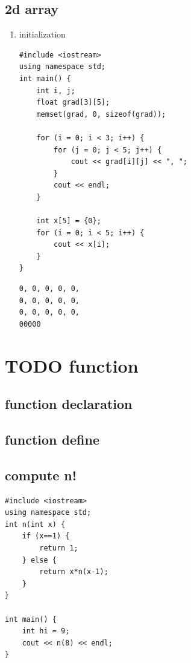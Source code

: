\documentclass[a4paper,12pt]{article}
\begin{document}
\subsection{2d array}
\label{sec:orgfdc5fa9}
\begin{enumerate}
\item initialization
\label{sec:org0519fc6}
\lstset{breaklines=true,language=cpp,label= ,caption= ,captionpos=b,firstnumber=1,numbers=left}
\begin{lstlisting}
#include <iostream>
using namespace std;
int main() {
    int i, j;
    float grad[3][5];
    memset(grad, 0, sizeof(grad));

    for (i = 0; i < 3; i++) {
        for (j = 0; j < 5; j++) {
            cout << grad[i][j] << ", ";
        }
        cout << endl;
    }

    int x[5] = {0};
    for (i = 0; i < 5; i++) {
        cout << x[i];
    }
}
\end{lstlisting}

\begin{verbatim}
0, 0, 0, 0, 0, 
0, 0, 0, 0, 0, 
0, 0, 0, 0, 0, 
00000
\end{verbatim}
\end{enumerate}

\section{{\bfseries\sffamily TODO} function}
\label{cpp_functions}
\subsection{function declaration}
\label{sec:orgc43509a}

\subsection{function define}
\label{sec:org3fa11e0}

\subsection{compute n!}
\label{sec:org9bd285c}
\lstset{breaklines=true,language=C++,label= ,caption= ,captionpos=b,numbers=none}
\begin{lstlisting}
#include <iostream>
using namespace std;
int n(int x) {
    if (x==1) {
        return 1;
    } else {
        return x*n(x-1);
    }
}

int main() {
    int hi = 9;
    cout << n(8) << endl;
}

\end{lstlisting}
\end{document}
